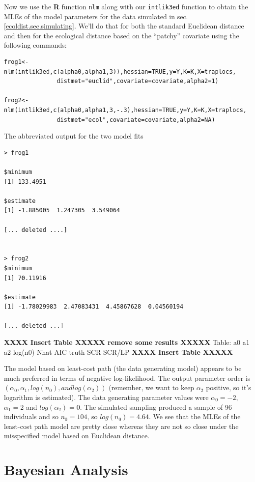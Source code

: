 Now we use the {\bf R} function \mbox{\tt nlm} along with
our \mbox{\tt intlik3ed} function to  obtain the MLEs of the
model parameters for the data simulated 
in sec. \ref{ecoldist.sec.simulating}.
 We'll do that for both the standard Euclidean distance
and then for the ecological distance based on the ``patchy''
covariate using the following commands:
{\small
 \begin{verbatim}
frog1<-nlm(intlik3ed,c(alpha0,alpha1,3)),hessian=TRUE,y=Y,K=K,X=traplocs,
               distmet="euclid",covariate=covariate,alpha2=1)

frog2<-nlm(intlik3ed,c(alpha0,alpha1,3,-.3),hessian=TRUE,y=Y,K=K,X=traplocs,
               distmet="ecol",covariate=covariate,alpha2=NA)
\end{verbatim}
}
The abbreviated output for the two model fits
\begin{verbatim}
> frog1

$minimum
[1] 133.4951

$estimate
[1] -1.885005  1.247305  3.549064

[... deleted ....]


> frog2
$minimum
[1] 70.11916

$estimate
[1] -1.78029983  2.47083431  4.45867628  0.04560194

[... deleted ...]
\end{verbatim}

{\bf XXXX Insert Table XXXXX remove some results XXXXX}
Table:
           a0      a1    a2    log(n0)  Nhat   AIC
 truth
 SCR
 SCR/LP
{\bf XXXX Insert Table XXXXX}

The model based on least-cost path (the data generating model) appears
to be much preferred in terms of negative log-likelihood.
The output parameter order is $(\alpha_{0}, \alpha_{1}, log(n_{0}), and
log(\alpha_{2}))$ (remember, we want to keep $\alpha_{2}$
positive, so it's logarithm is estimated). 
The data generating parameter values were
$\alpha_{0} = - 2$, 
$\alpha_{1} = 2$ and $log(\alpha_{2}) = 0$.
The simulated sampling produced a sample of 96 individuals and so
$n_{0} = 104$, so $log(n_{0}) = 4.64$. We see that the 
 MLEs of the least-cost path model are pretty close whereas they are
 not so close under the misspecified model based on Euclidean distance.






\section{Bayesian Analysis}

